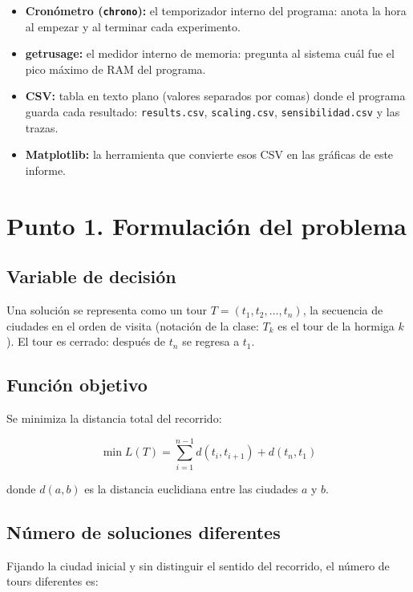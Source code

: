 \documentclass[12pt,a4paper]{article}
\begin{document}
\begin{itemize}
compilar y con qué opciones), para no escribir el comando largo a mano.
\item \textbf{Cronómetro (\texttt{chrono}):} el temporizador interno del
programa: anota la hora al empezar y al terminar cada experimento.
\item \textbf{getrusage:} el medidor interno de memoria: pregunta al sistema
cuál fue el pico máximo de RAM del programa.
\item \textbf{CSV:} tabla en texto plano (valores separados por comas) donde
el programa guarda cada resultado: \texttt{results.csv},
\texttt{scaling.csv}, \texttt{sensibilidad.csv} y las trazas.
\item \textbf{Matplotlib:} la herramienta que convierte esos CSV en las
gráficas de este informe.
\end{itemize}

\section{Punto 1. Formulación del problema}

\subsection{Variable de decisión}

Una solución se representa como un tour $T = (t_1, t_2, \dots, t_n)$, la secuencia
de ciudades en el orden de visita (notación de la clase: $T_k$ es el tour de la
hormiga $k$). El tour es cerrado: después de $t_n$ se regresa a $t_1$.

\subsection{Función objetivo}

Se minimiza la distancia total del recorrido:

\begin{equation}
\min L(T) = \sum_{i=1}^{n-1} d(t_i, t_{i+1}) + d(t_n, t_1)
\end{equation}

donde $d(a,b)$ es la distancia euclidiana entre las ciudades $a$ y $b$.

\subsection{Número de soluciones diferentes}

Fijando la ciudad inicial y sin distinguir el sentido del recorrido, el número de
tours diferentes es:
\end{document}
